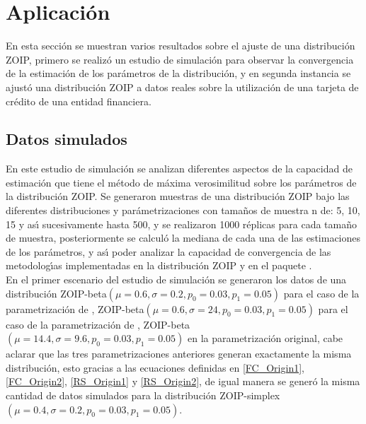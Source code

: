 
\section{Aplicaci\'{o}n}
En esta secci\'{o}n se muestran varios resultados sobre el ajuste de una distribuci\'{o}n ZOIP, primero se realiz\'{o} un estudio de simulaci\'{o}n para observar la convergencia de la estimaci\'{o}n de los par\'{a}metros de la distribuci\'{o}n, y en segunda instancia se ajust\'{o} una distribuci\'{o}n ZOIP a datos reales sobre la utilizaci\'{o}n de una tarjeta de cr\'{e}dito de una entidad financiera.

\subsection{Datos simulados}
En este estudio de simulaci\'{o}n se analizan diferentes aspectos de la capacidad de estimaci\'{o}n que tiene el m\'{e}todo de m\'{a}xima verosimilitud sobre los par\'{a}metros de la distribuci\'{o}n ZOIP. Se generaron muestras de una distribuci\'{o}n ZOIP bajo las diferentes distribuciones y par\'{a}metrizaciones con tama\~{n}os de muestra n de: 5, 10, 15 y as\'{\i} sucesivamente hasta 500, y se realizaron 1000 r\'{e}plicas para cada tama\~{n}o de muestra, posteriormente se calcul\'{o} la mediana de cada una de las estimaciones de los par\'{a}metros, y as\'{\i} poder analizar la capacidad de convergencia de las metodolog\'{\i}as implementadas en la distribuci\'{o}n ZOIP y en el paquete .\\

En el primer escenario del estudio de simulaci\'{o}n se generaron los datos de una distribuci\'{o}n ZOIP-beta$(\mu=0.6 ,\sigma=0.2 , p_0=0.03 , p_1= 0.05)$ para el caso de la parametrizaci\'{o}n de \cite{Stasinopoulos2}, ZOIP-beta$(\mu=0.6 , \sigma=24 , p_0=0.03 , p_1= 0.05)$ para el caso de la parametrizaci\'{o}n de \cite{Ferrari2}, ZOIP-beta$(\mu=14.4 , \sigma=9.6 , p_0=0.03 , p_1= 0.05)$ en la parametrizaci\'{o}n original, cabe aclarar que las tres parametrizaciones anteriores generan exactamente la misma distribuci\'{o}n, esto gracias a las ecuaciones definidas en \eqref{FC_Origin1}, \eqref{FC_Origin2}, \eqref{RS_Origin1} y \eqref{RS_Origin2}, de igual manera se gener\'{o} la misma cantidad de datos simulados para la distribuci\'{o}n ZOIP-simplex$(\mu=0.4 , \sigma=0.2 , p_0=0.03 , p_1= 0.05)$.\\



